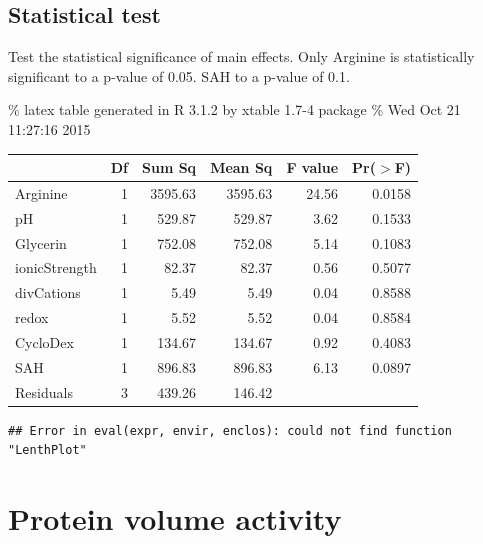 \documentclass[]{article}
\begin{document}
\subsection{Statistical test}\label{statistical-test}

Test the statistical significance of main effects. Only Arginine is
statistically significant to a p-value of 0.05. SAH to a p-value of 0.1.

\% latex table generated in R 3.1.2 by xtable 1.7-4 package \% Wed Oct
21 11:27:16 2015

\begin{table}[ht]
\centering
\begin{tabular}{lrrrrr}
  \hline
 & Df & Sum Sq & Mean Sq & F value & Pr($>$F) \\ 
  \hline
Arginine      & 1 & 3595.63 & 3595.63 & 24.56 & 0.0158 \\ 
  pH            & 1 & 529.87 & 529.87 & 3.62 & 0.1533 \\ 
  Glycerin      & 1 & 752.08 & 752.08 & 5.14 & 0.1083 \\ 
  ionicStrength & 1 & 82.37 & 82.37 & 0.56 & 0.5077 \\ 
  divCations    & 1 & 5.49 & 5.49 & 0.04 & 0.8588 \\ 
  redox         & 1 & 5.52 & 5.52 & 0.04 & 0.8584 \\ 
  CycloDex      & 1 & 134.67 & 134.67 & 0.92 & 0.4083 \\ 
  SAH           & 1 & 896.83 & 896.83 & 6.13 & 0.0897 \\ 
  Residuals     & 3 & 439.26 & 146.42 &  &  \\ 
   \hline
\end{tabular}
\end{table}

\begin{verbatim}
## Error in eval(expr, envir, enclos): could not find function "LenthPlot"
\end{verbatim}

\section{Protein volume activity}\label{protein-volume-activity}
\end{document}
